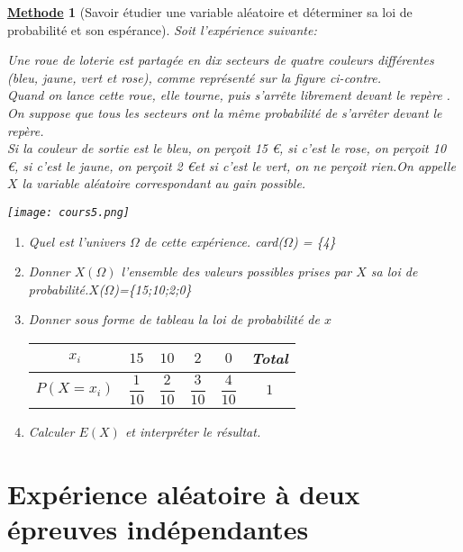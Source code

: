 \documentclass[10pt,a4paper]{article}
\renewcommand{\arraystretch}{}
\theoremstyle{break}
\newtheorem{Meth}{\underline{Methode}}
\begin{document}
		\begin{Meth}[Savoir étudier une variable aléatoire et déterminer sa loi de probabilité et son espérance]
	Soit l'expérience suivante: \\
		\begin{minipage}{0.6\textwidth}
			Une roue de loterie est partagée en dix secteurs de quatre couleurs différentes (bleu, jaune, vert et rose), comme représenté sur la figure ci-contre.\\ Quand on lance cette roue, elle tourne, puis s'arrête librement devant le repère . On suppose que tous les secteurs ont la même probabilité de s'arrêter devant le repère.\\
			Si la couleur de sortie est le bleu, on perçoit 15 \euro, si c'est le rose, on perçoit 10 \euro, si c'est le jaune, on perçoit 2 \euro et si c'est le vert, on ne perçoit rien.On appelle $X$ la variable aléatoire correspondant au gain possible. 
		\end{minipage} 
		\begin{minipage}{0.4\textwidth}
			\texttt{[image: cours5.png]}
		\end{minipage}
	\begin{enumerate}
		\item 	Quel est  l'univers $\Omega$ de cette expérience. card($\Omega$) = \{4\}
		\item Donner $X(\Omega)$ l'ensemble des valeurs possibles prises par $X$ sa loi de probabilité.$X$($\Omega$)=\{15;10;2;0\}
		\item Donner sous forme de tableau la loi de probabilité de $x$
\begin{center}
            \renewcommand{\arraystretch}{1.5}
            \begin{tabular}{|c|c|c|c|c|c|}
                \hline
                $x_i$&$15$&$10$&$2$&$0$&Total\\
                \hline
                $P(X=x_i)$& $\dfrac{1}{10}$& $\dfrac{2}{10}$&  $\dfrac{3}{10}$&$\dfrac{4}{10}$&$1$\\
                \hline
            \end{tabular}
        \end{center}
		\item Calculer $E(X)$ et interpréter le résultat.
	\end{enumerate}	

	
\end{Meth}
	\section{Expérience aléatoire à deux épreuves indépendantes}
\end{document}
